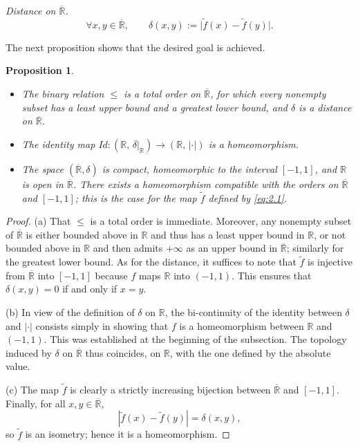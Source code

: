 \documentclass[11pt]{article}
\newtheorem{proposition}{Proposition}[section]
\theoremstyle{definition}
\begin{document}
\medskip\noindent
\textit{Distance on $\overline{\mathbb{R}}$.}
\begin{equation}\label{eq:2.2}
\forall x,y\in\overline{\mathbb{R}},\qquad
\delta(x,y):=\bigl|\tilde f(x)-\tilde f(y)\bigr|.
\end{equation}

The next proposition shows that the desired goal is achieved.

\begin{proposition}
\begin{itemize}[leftmargin=1.5em]
\item[(a)] The binary relation $\le$ is a total order on $\overline{\mathbb{R}}$, for which every nonempty subset has a least upper bound and a greatest lower bound, and $\delta$ is a distance on $\overline{\mathbb{R}}$.
\item[(b)] The identity map $Id:(\mathbb{R},\,\delta\!\big|_{\mathbb{R}})\to(\mathbb{R},\,|\cdot|)$ is a homeomorphism.
\item[(c)] The space $(\overline{\mathbb{R}},\delta)$ is compact, homeomorphic to the interval $[-1,1]$, and $\mathbb{R}$ is open in $\overline{\mathbb{R}}$.
There exists a homeomorphism compatible with the orders on $\overline{\mathbb{R}}$ and $[-1,1]$; this is the case for the map $\tilde f$ defined by \eqref{eq:2.1}.
\end{itemize}
\end{proposition}

\begin{proof}
(a) That $\le$ is a total order is immediate.
Moreover, any nonempty subset of $\overline{\mathbb{R}}$ is either bounded above in $\mathbb{R}$ and thus has a least upper bound in $\mathbb{R}$, or not bounded above in $\mathbb{R}$ and then admits $+\infty$ as an upper bound in $\overline{\mathbb{R}}$; similarly for the greatest lower bound.
As for the distance, it suffices to note that $\tilde f$ is injective from $\overline{\mathbb{R}}$ into $[-1,1]$ because $f$ maps $\mathbb{R}$ into $(-1,1)$.
This ensures that $\delta(x,y)=0$ if and only if $x=y$.

(b) In view of the definition of $\delta$ on $\mathbb{R}$, the bi-continuity of the identity between $\delta$ and $|\cdot|$ consists simply in showing that $f$ is a homeomorphism between $\mathbb{R}$ and $(-1,1)$.
This was established at the beginning of the subsection.
The topology induced by $\delta$ on $\overline{\mathbb{R}}$ thus coincides, on $\mathbb{R}$, with the one defined by the absolute value.

(c) The map $\tilde f$ is clearly a strictly increasing bijection between $\overline{\mathbb{R}}$ and $[-1,1]$.
Finally, for all $x,y\in\overline{\mathbb{R}}$,
\[
|\tilde f(x)-\tilde f(y)|=\delta(x,y),
\]
so $\tilde f$ is an isometry; hence it is a homeomorphism.
\end{proof}
\end{document}
